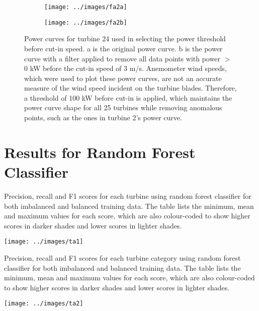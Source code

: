 \begin{figure}
  \centering
  \begin{subfigure}[t]{.5\textwidth}
    \centering
    \texttt{[image: ../images/fa2a]}
    \caption{}
  \end{subfigure}
  \begin{subfigure}[t]{.5\textwidth}
    \centering
    \texttt{[image: ../images/fa2b]}
    \caption{}
  \end{subfigure}
  \captionsetup{labelformat=empty,list=no}
  \caption{Power curves for turbine 24 used in selecting the power threshold
  before cut-in speed. a is the original power curve. b is the power curve
  with a filter applied to remove all data points with power \ensuremath{>} 0 kW before
  the cut-in speed of 3 m/s. Anemometer wind speeds, which were used to plot
  these power curves, are not an accurate measure of the wind speed incident
  on the turbine blades. Therefore, a threshold of 100 kW before cut-in is
  applied, which maintains the power curve shape for all 25 turbines while
  removing anomalous points, such as the ones in turbine 2's power curve.}
\end{figure}

\chapter{Results for Random Forest Classifier}\label{a3}

\begin{landscape}
  \begin{table}
    \centering
    \captionsetup{labelformat=empty,list=no}
    \caption{Precision, recall and F1 scores for each turbine using random
    forest classifier for both imbalanced and balanced training data. The
    table lists the minimum, mean and maximum values for each score, which are
    also colour-coded to show higher scores in darker shades and lower scores
    in lighter shades.}
    \texttt{[image: ../images/ta1]}
  \end{table}
\end{landscape}

\begin{table}
  \centering
  \captionsetup{labelformat=empty,list=no}
  \caption{Precision, recall and F1 scores for each turbine category using
  random forest classifier for both imbalanced and balanced training data. The
  table lists the minimum, mean and maximum values for each score, which are
  also colour-coded to show higher scores in darker shades and lower scores in
  lighter shades.}
  \texttt{[image: ../images/ta2]}
\end{table}

